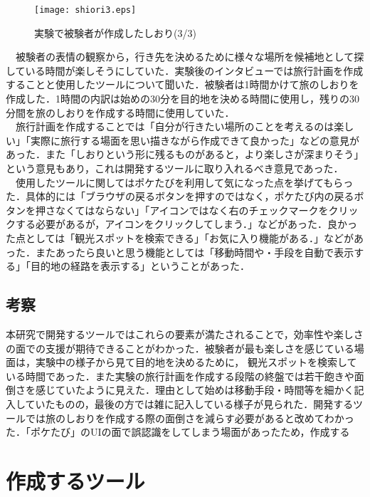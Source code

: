 \documentclass{funthesis}
\begin{document}
\begin{figure}[htpb]
\begin{center}
\texttt{[image: shiori3.eps]}
\caption{実験で被験者が作成したしおり(3/3)}
\end{center}
\end{figure}


　被験者の表情の観察から，行き先を決めるために様々な場所を候補地として探している時間が楽しそうにしていた．実験後のインタビューでは旅行計画を作成することと使用したツールについて聞いた．被験者は1時間かけて旅のしおりを作成した．1時間の内訳は始めの30分を目的地を決める時間に使用し，残りの30分間を旅のしおりを作成する時間に使用していた．\\
　旅行計画を作成することでは「自分が行きたい場所のことを考えるのは楽しい」「実際に旅行する場面を思い描きながら作成できて良かった」などの意見があった．また「しおりという形に残るものがあると，より楽しさが深まりそう」という意見もあり，これは開発するツールに取り入れるべき意見であった．\\
　使用したツールに関してはポケたびを利用して気になった点を挙げてもらった．具体的には「ブラウザの戻るボタンを押すのではなく，ポケたび内の戻るボタンを押さなくてはならない」「アイコンではなく右のチェックマークをクリックする必要があるが，アイコンをクリックしてしまう．」などがあった．良かった点としては「観光スポットを検索できる」「お気に入り機能がある．」などがあった．またあったら良いと思う機能としては「移動時間や・手段を自動で表示する」「目的地の経路を表示する」ということがあった．

\section{考察}
本研究で開発するツールではこれらの要素が満たされることで，効率性や楽しさの面での支援が期待できることがわかった．被験者が最も楽しさを感じている場面は，実験中の様子から見て目的地を決めるために，
観光スポットを検索している時間であった．また実験の旅行計画を作成する段階の終盤では若干飽きや面倒さを感じていたように見えた．理由として始めは移動手段・時間等を細かく記入していたものの，最後の方では雑に記入している様子が見られた．開発するツールでは旅のしおりを作成する際の面倒さを減らす必要があると改めてわかった．「ポケたび」のUIの面で誤認識をしてしまう場面があったため，作成する



\chapter{作成するツール}%
\end{document}
